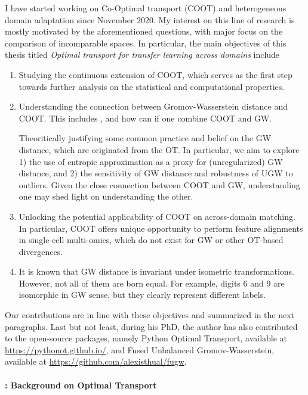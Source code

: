 I have started working on Co-Optimal transport (COOT) and heterogeneous domain adaptation
since November 2020. My interest on this line of research is mostly motivated by
the aforementioned questions, with major focus on the comparison of incomparable spaces.
In particular, the main objectives of this thesis titled
\textit{Optimal transport for transfer learning across domains} include
\begin{enumerate}
    \item Studying the continuous extension of COOT, which serves as the first step towards
    further analysis on the statistical and computational properties.

    \item Understanding the connection between Gromov-Wasserstein distance and COOT.
    This includes , and how can if one combine COOT and GW.

    Theoritically justifying some common practice and belief on the GW distance,
    which are originated from the OT. In particular, we aim to explore
    1) the use of entropic approximation as a proxy for (unregularized) GW distance,
    and 2) the sensitivity of GW distance and robustness of UGW to outliers.
    Given the close connection between COOT and GW,
    understanding one may shed light on understanding the other.

    \item Unlocking the potential applicability of COOT on across-domain matching.
    In particular, COOT offers unique opportunity to perform feature alignments
    in single-cell multi-omics, which do not exist for GW or other OT-based divergences.

    \item It is known that GW distance is invariant under isometric transformations. However,
    not all of them are born equal. For example, digits 6 and 9 are isomorphic in GW sense,
    but they clearly represent different labels.
\end{enumerate}
Our contributions are in line with these objectives and summarized in the next paragraphs.
Last but not least, during his PhD, the author has also contributed to the open-source packages,
namely Python Optimal Transport, available at \url{https://pythonot.github.io/}, and
Fused Unbalanced Gromov-Wasserstein, available at \url{https://github.com/alexisthual/fugw}.

\paragraph{ : Background on Optimal Transport}

